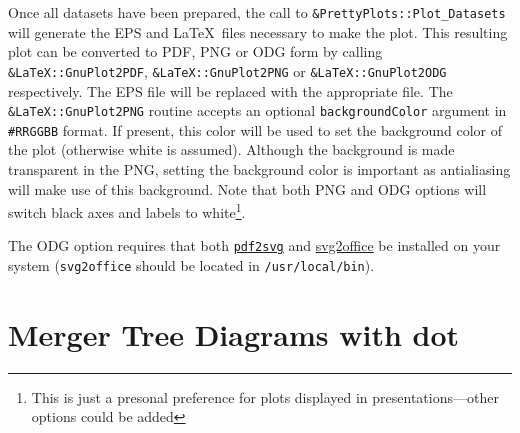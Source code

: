 Once all datasets have been prepared, the call to {\tt \&PrettyPlots::Plot\_Datasets} will generate the EPS and \LaTeX\ files necessary to make the plot. This resulting plot can be converted to PDF, PNG or ODG form by calling {\tt \&LaTeX::GnuPlot2PDF}, {\tt \&LaTeX::GnuPlot2PNG} or {\tt \&LaTeX::GnuPlot2ODG} respectively. The EPS file will be replaced with the appropriate file. The {\tt \&LaTeX::GnuPlot2PNG} routine accepts an optional {\tt backgroundColor} argument in {\tt \#RRGGBB} format. If present, this color will be used to set the background color of the plot (otherwise white is assumed). Although the background is made transparent in the PNG, setting the background color is important as antialiasing will make use of this background. Note that both PNG and ODG options will switch black axes and labels to white\footnote{This is just a presonal preference for plots displayed in presentations---other options could be added}.

The ODG option requires that both \href{http://www.cityinthesky.co.uk/opensource/pdf2svg}{{\tt pdf2svg}} and \href{http://www.haumacher.de/svg-import/}{{svg2office}} be installed on your system ({\tt svg2office} should be located in {\tt /usr/local/bin}).

\section{Merger Tree Diagrams with {\sc dot}}


